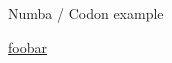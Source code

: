 \documentclass[
    xcolor={svgnames,dvipsnames},
    hyperref={colorlinks, citecolor=DeepPink4, linkcolor=DarkRed, urlcolor=DarkBlue}
    ]{beamer}  %
\newcommand{\1}{\mathbbm 1}
\begin{document}
\begin{frame}
    
    \begin{figure}
        \centering
    \end{figure}

\end{frame}




\begin{frame}

    Numba / Codon example

    \url{foobar}

\end{frame}



    
\end{document}
